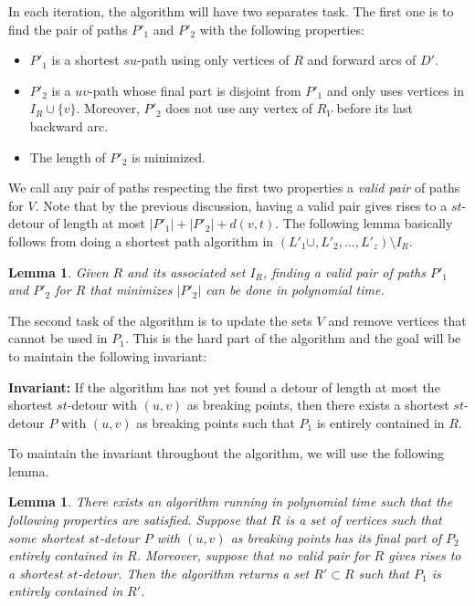 \documentclass[utf8,11pt]{article}
\theoremstyle{plain}
\newtheorem{lemma}[theorem]{Lemma}
\theoremstyle{definition}
\begin{document}
In each iteration, the algorithm will have two separates task. The first one is to find the pair of paths $P'_1$ and $P'_2$ with the following properties: 
\begin{itemize}
    \item $P'_1$ is a shortest $su$-path using only vertices of $R$ and forward arcs of $D'$.
    \item $P'_2$ is a $uv$-path whose final part is disjoint from $P'_1$ and only uses vertices in $I_R \cup \{v\}$. Moreover, $P'_2$ does not use any vertex of $R_V$ before its last backward arc.
    \item The length of $P'_2$ is minimized.
\end{itemize}
We call any pair of paths respecting the first two properties a \textit{valid pair} of paths for $V$. Note that by the previous discussion, having a valid pair gives rises to a $st$-detour of length at most $|P'_1| + |P'_2| + d(v,t)$. The following lemma basically follows from doing a shortest path algorithm in $(L'_1 \cup, L'_2, \dots, L'_{z} )\setminus I_R$. 

\begin{lemma}\label{lem:valid_pair}
    Given $R$ and its associated set $I_R$, finding a valid pair of paths $P'_1$ and $P'_2$ for $R$ that minimizes $|P'_2|$ can be done in polynomial time. 
\end{lemma}
The second task of the algorithm is to update the sets $V$ and remove vertices that cannot be used in $P_1$. This is the hard part of the algorithm and the goal will be to maintain the following invariant: 

\textbf{Invariant:} If the algorithm has not yet found a detour of length at most the shortest $st$-detour with $(u,v)$ as breaking points, then there exists a shortest $st$-detour $P$ with $(u,v)$ as breaking points such that $P_1$ is entirely contained in $R$.

To maintain the invariant throughout the algorithm, we will use the following lemma.

\begin{lemma}\label{lem:update_R}
    There exists an algorithm running in polynomial time such that the following properties are satisfied.
    Suppose that $R$ is a set of vertices such that some shortest $st$-detour $P$ with $(u,v)$ as breaking points has its final part of $P_2$ entirely contained in $R$. Moreover, suppose that no valid pair for $R$ gives rises to a shortest $st$-detour. Then the algorithm returns a set $R' \subset R$ such that $P_1$ is entirely contained in $R'$.
\end{lemma}
\end{document}
